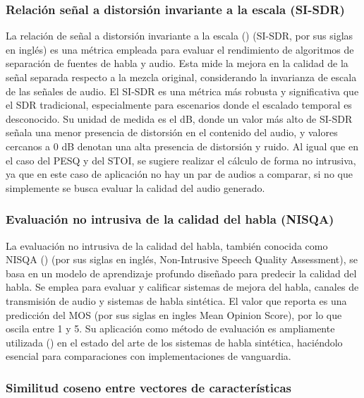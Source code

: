 \subsubsection{Relación señal a distorsión invariante a la escala (SI-SDR)}

La relación de señal a distorsión invariante a la escala (\cite{leroux2019}) (SI-SDR, por sus siglas en inglés) es una métrica empleada para evaluar el rendimiento de algoritmos de separación de fuentes de habla y audio. Esta mide la mejora en la calidad de la señal separada respecto a la mezcla original, considerando la invarianza de escala de las señales de audio. El SI-SDR es una métrica más robusta y significativa que el SDR tradicional, especialmente para escenarios donde el escalado temporal es desconocido. Su unidad de medida es el dB, donde un valor más alto de SI-SDR señala una menor presencia de distorsión en el contenido del audio, y valores cercanos a 0 dB denotan una alta presencia de distorsión y ruido. Al igual que en el caso del PESQ y del STOI, se sugiere realizar el cálculo de forma no intrusiva, ya que en este caso de aplicación no hay un par de audios a comparar, si no que simplemente se busca evaluar la calidad del audio generado.

\subsubsection{Evaluación no intrusiva de la calidad del habla (NISQA)}

La evaluación no intrusiva de la calidad del habla, también conocida como NISQA (\cite{mittag2021}) (por sus siglas en inglés, Non-Intrusive Speech Quality Assessment), se basa en un modelo de aprendizaje profundo diseñado para predecir la calidad del habla. Se emplea para evaluar y calificar sistemas de mejora del habla, canales de transmisión de audio y sistemas de habla sintética. El valor que reporta es una predicción del MOS (por sus siglas en ingles Mean Opinion Score), por lo que oscila entre 1 y 5. Su aplicación como método de evaluación es ampliamente utilizada (\cite{hasanabadi2023mfccgan}) en el estado del arte de los sistemas de habla sintética, haciéndolo esencial para comparaciones con implementaciones de vanguardia.

\subsubsection{Similitud coseno entre vectores de características}

